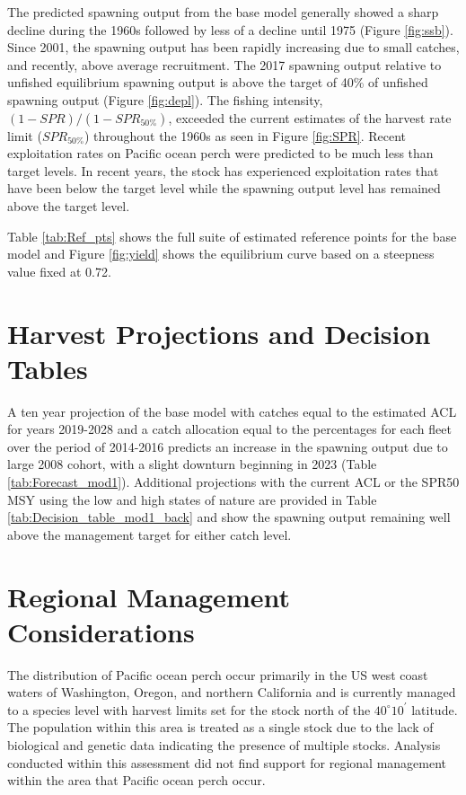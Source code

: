\documentclass[12pt,]{article}
\begin{document}
The predicted spawning output from the base model generally showed a
sharp decline during the 1960s followed by less of a decline until 1975
(Figure \ref{fig:ssb}). Since 2001, the spawning output has been rapidly
increasing due to small catches, and recently, above average
recruitment. The 2017 spawning output relative to unfished equilibrium
spawning output is above the target of 40\% of unfished spawning output
(Figure \ref{fig:depl}). The fishing intensity,
\((1-SPR)/(1-SPR_{50\%})\), exceeded the current estimates of the
harvest rate limit (\(SPR_{50\%}\)) throughout the 1960s as seen in
Figure \ref{fig:SPR}. Recent exploitation rates on Pacific ocean perch
were predicted to be much less than target levels. In recent years, the
stock has experienced exploitation rates that have been below the target
level while the spawning output level has remained above the target
level.

Table \ref{tab:Ref_pts} shows the full suite of estimated reference
points for the base model and Figure \ref{fig:yield} shows the
equilibrium curve based on a steepness value fixed at 0.72.

\section{Harvest Projections and Decision
Tables}\label{harvest-projections-and-decision-tables}

A ten year projection of the base model with catches equal to the
estimated ACL for years 2019-2028 and a catch allocation equal to the
percentages for each fleet over the period of 2014-2016 predicts an
increase in the spawning output due to large 2008 cohort, with a slight
downturn beginning in 2023 (Table \ref{tab:Forecast_mod1}). Additional
projections with the current ACL or the SPR50 MSY using the low and high
states of nature are provided in Table
\ref{tab:Decision_table_mod1_back} and show the spawning output
remaining well above the management target for either catch level.

\section{Regional Management
Considerations}\label{regional-management-considerations}

The distribution of Pacific ocean perch occur primarily in the US west
coast waters of Washington, Oregon, and northern California and is
currently managed to a species level with harvest limits set for the
stock north of the \(40^\circ 10^\prime\) latitude. The population
within this area is treated as a single stock due to the lack of
biological and genetic data indicating the presence of multiple stocks.
Analysis conducted within this assessment did not find support for
regional management within the area that Pacific ocean perch occur.
\end{document}
